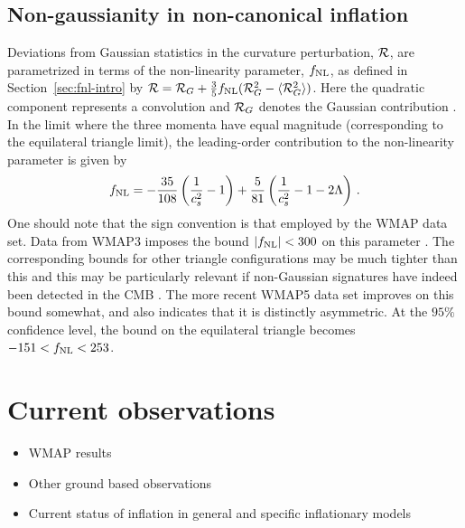 \subsection{Non-gaussianity in non-canonical inflation}
Deviations from Gaussian statistics in the curvature perturbation, ${\cal{R}}$,
are parametrized in terms of the non-linearity parameter, 
$f_{\mathrm{NL}}$, as defined in Section~\ref{sec:fnl-intro} by 
${\cal{R}} = {\cal{R}}_G + \frac{3}{5} f_{\mathrm{NL}}  (
{\cal{R}}_G^2 -\langle {\cal{R}}_G^2 \rangle )$. Here the 
quadratic component represents a convolution and 
${\cal{R}}_G$ denotes the Gaussian contribution \cite{maldacena}\footnotemark.
 In the limit  
where the three momenta have equal magnitude (corresponding to the equilateral  
triangle limit), the leading-order contribution to the non-linearity 
parameter is given by \cite{chenetal,lidser3}
% 
\begin{equation} 
\label{eq:fnldefn-dbiintro}
 f_{\mathrm{NL}} = -\frac{35}{108}\left(\frac{1}{c_s^2} -1 \right) +
\frac{5}{81}\left( \frac{1}{c_s^2} -1 -2\Lambda \right) \,.
\end{equation}
%  
One should note that the sign convention is that employed
by the WMAP data set.
Data from WMAP3 imposes the bound $|f_{\mathrm{NL}}| < 300$ on this parameter
\cite{spergel}. The corresponding bounds for other triangle configurations 
may be much tighter than this and this may be particularly relevant if 
non-Gaussian signatures have indeed been detected in the 
CMB \cite{Yadav:2007yy,crim}. The more recent WMAP5 data set
\cite{Komatsu:2008hk} improves on this bound somewhat, and
also indicates that it is distinctly asymmetric. At the $95 \%$ confidence
level, the bound on the 
equilateral triangle becomes $-151 < f_{\mathrm{NL}} < 253$.





\section{Current observations}
\label{sec:obs-intro}
\begin{itemize}
 \item WMAP results
 \item Other ground based observations
 \item Current status of inflation in general and specific inflationary models
\end{itemize}


